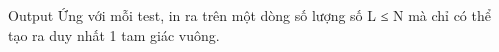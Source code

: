Output
Ứng với mỗi test, in ra trên một dòng số lượng số L ≤ N mà chỉ có thể tạo ra duy nhất 1 tam giác vuông.